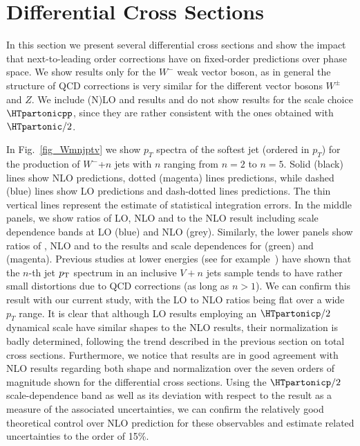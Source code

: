 \section{Differential Cross Sections}
\label{diffxswv}

In this section we present several differential cross sections and show
the impact that next-to-leading order corrections have on fixed-order predictions over
phase space. We show results only for the $W^-$ weak vector boson,
as in general the structure of QCD corrections is very similar for the
different vector bosons $W^\pm$ and $Z$. We include (N)LO and \MILNLOp{} results and do not show results for the scale choice $\HTpartonicpp$, since they are rather consistent with the ones obtained with $\HTpartonic/2$.



In Fig.~\ref{fig_Wmnjptv} we show $p_T$ spectra of the softest jet (ordered in $p_T$) for the production of $W^-$+$n$ jets with $n$ ranging from $n=2$ to $n=5$. Solid (black) lines show NLO predictions, dotted (magenta) lines
\MINLOp{} predictions, while dashed (blue) lines show LO predictions
and dash-dotted lines \MILOp{} predictions. The thin vertical lines
represent the estimate of statistical integration errors. In the middle panels, we show ratios of LO, NLO and \MINLOp{} to the NLO result including scale
dependence bands at LO (blue) and NLO (grey). Similarly, the lower panels show
ratios of \MILOp{}, NLO and \MINLOp{} to the \MINLOp{} results and
scale dependences for \MILOp{} (green) and
\MINLOp{} (magenta). Previous studies at lower energies (see for example~\cite{BH:W5j}) have
shown that the $n$-th jet $p_{\textrm T}$ spectrum in an inclusive $V+n$ jets sample
tends to have rather small distortions due to QCD corrections (as long
as $n>1$). We can confirm this result with our current study, with the
LO to NLO ratios being flat over a wide $p_T$ range. It is clear that
although LO results employing an $\HTpartonicp/2$ dynamical scale have similar shapes to the NLO results, their
normalization is badly determined, following the trend described in the
previous section on total cross sections. Furthermore, we notice that \MINLOp{}
results are in good agreement with NLO results regarding both shape and
normalization over the seven orders of magnitude shown for the differential
cross sections. Using the $\HTpartonicp/2$ scale-dependence
band as well as its deviation with respect to the \MINLOp{} result as a measure of the associated uncertainties, we can confirm the relatively good theoretical control over NLO prediction for these observables and estimate related uncertainties to the order of 15\%.



